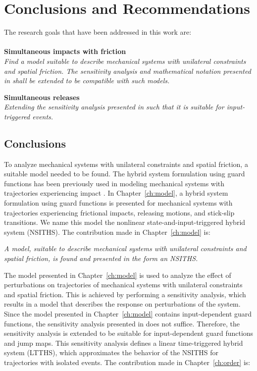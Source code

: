 \documentclass[../DC2017114Bouma.tex]{subfiles}
\begin{document}
\graphicspath{{05_Conclusions/img/}}
\renewcommand{\chaptermark}[1]{\markboth{\thechapter.\ #1}{}}
\renewcommand{\sectionmark}[1]{\markright{#1}{}}
\pagestyle{fancyreport}
\cleartooddpage
\pagestyle{fancyreport}
\chapter{Conclusions and Recommendations}\label{ch:concl}
The research goals that have been addressed in this work are:\\\\
\textbf{Simultaneous impacts with friction}\\
\textit{Find a model suitable to describe mechanical systems with unilateral constraints and spatial friction. The sensitivity analysis and mathematical notation presented in \cite{Rijnen2018a} shall be extended to be compatible with such models.}

\textbf{Simultaneous releases}\\
\textit{Extending the sensitivity analysis presented in \cite{Rijnen2018a} such that it is suitable for input-triggered events.}

\section{Conclusions}
To analyze mechanical systems with unilateral constraints and spatial friction, a suitable model needed to be found. The hybrid system formulation using guard functions has been previously used in modeling mechanical systems with trajectories experiencing impact \cite{Rijnen2018a}. In Chapter~\ref{ch:model}, a hybrid system formulation using guard functions is presented for mechanical systems with trajectories experiencing frictional impacts, releasing motions, and stick-slip transitions. We name this model the nonlinear state-and-input-triggered hybrid system (NSITHS). The contribution made in Chapter~\ref{ch:model} is:

\textit{A model, suitable to describe mechanical systems with unilateral constraints and spatial friction, is found and presented in the form an NSITHS.}

The model presented in Chapter~\ref{ch:model} is used to analyze the effect of perturbations on trajectories of mechanical systems with unilateral constraints and spatial friction. This is achieved by performing a sensitivity analysis, which results in a model that describes the response on perturbations of the system. Since the model presented in Chapter~\ref{ch:model} contains input-dependent guard functions, the sensitivity analysis presented in \cite{Rijnen2017} does not suffice. Therefore, the sensitivity analysis is extended to be suitable for input-dependent guard functions and jump maps. This sensitivity analysis defines a linear time-triggered hybrid system (LTTHS), which approximates the behavior of the NSITHS for trajectories with isolated events. The contribution made in Chapter~\ref{ch:order} is:
\end{document}

